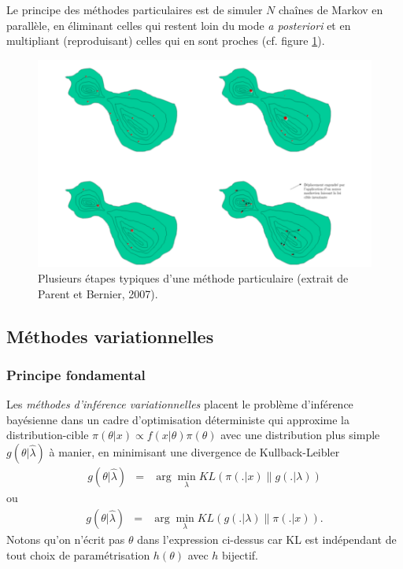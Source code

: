 Le principe des méthodes particulaires est de simuler $N$ chaînes de Markov en parallèle, en éliminant celles qui restent loin du mode {\it a posteriori} et en multipliant (reproduisant) celles qui en sont proches (cf. figure \ref{particle}). \\

\begin{figure}[h!]
\centering
\includegraphics[scale=0.3]{figures/calcul/particle.png}
\caption{Plusieurs étapes typiques d'une méthode particulaire (extrait de Parent et Bernier, 2007).}
\label{particle}
\end{figure}


\subsection{Méthodes variationnelles}


\subsubsection{Principe fondamental}

Les \emph{méthodes d'inférence variationnelles} placent le problème d'inférence bayésienne dans un cadre d'optimisation déterministe qui approxime la distribution-cible $\pi(\theta|x)\propto f(x|\theta)\pi(\theta)$ avec une distribution plus simple $g(\theta|\hat{\lambda})$ à manier, en minimisant une divergence de Kullback-Leibler 
\begin{eqnarray}
g(\theta|\hat{\lambda})  & = & \arg\min\limits_{\lambda} KL\left( \pi(.|x) \| g(.|\lambda) \right) \label{def.var}
\end{eqnarray}
ou
\begin{eqnarray*}
g(\theta|\hat{\lambda})  & = & \arg\min\limits_{\lambda} KL\left(  g(.|\lambda) \| \pi(.|x) \right).
\end{eqnarray*}
Notons qu'on n'écrit pas $\theta$ dans l'expression ci-dessus car KL est indépendant de tout choix de paramétrisation $h(\theta)$ avec $h$ bijectif. \\

